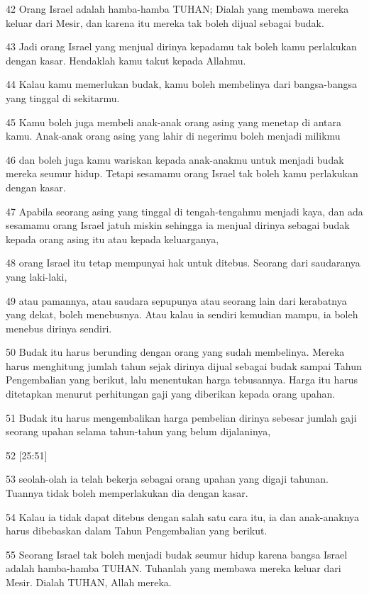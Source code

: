 \par 42 Orang Israel adalah hamba-hamba TUHAN; Dialah yang membawa mereka keluar dari Mesir, dan karena itu mereka tak boleh dijual sebagai budak.
\par 43 Jadi orang Israel yang menjual dirinya kepadamu tak boleh kamu perlakukan dengan kasar. Hendaklah kamu takut kepada Allahmu.
\par 44 Kalau kamu memerlukan budak, kamu boleh membelinya dari bangsa-bangsa yang tinggal di sekitarmu.
\par 45 Kamu boleh juga membeli anak-anak orang asing yang menetap di antara kamu. Anak-anak orang asing yang lahir di negerimu boleh menjadi milikmu
\par 46 dan boleh juga kamu wariskan kepada anak-anakmu untuk menjadi budak mereka seumur hidup. Tetapi sesamamu orang Israel tak boleh kamu perlakukan dengan kasar.
\par 47 Apabila seorang asing yang tinggal di tengah-tengahmu menjadi kaya, dan ada sesamamu orang Israel jatuh miskin sehingga ia menjual dirinya sebagai budak kepada orang asing itu atau kepada keluarganya,
\par 48 orang Israel itu tetap mempunyai hak untuk ditebus. Seorang dari saudaranya yang laki-laki,
\par 49 atau pamannya, atau saudara sepupunya atau seorang lain dari kerabatnya yang dekat, boleh menebusnya. Atau kalau ia sendiri kemudian mampu, ia boleh menebus dirinya sendiri.
\par 50 Budak itu harus berunding dengan orang yang sudah membelinya. Mereka harus menghitung jumlah tahun sejak dirinya dijual sebagai budak sampai Tahun Pengembalian yang berikut, lalu menentukan harga tebusannya. Harga itu harus ditetapkan menurut perhitungan gaji yang diberikan kepada orang upahan.
\par 51 Budak itu harus mengembalikan harga pembelian dirinya sebesar jumlah gaji seorang upahan selama tahun-tahun yang belum dijalaninya,
\par 52 [25:51]
\par 53 seolah-olah ia telah bekerja sebagai orang upahan yang digaji tahunan. Tuannya tidak boleh memperlakukan dia dengan kasar.
\par 54 Kalau ia tidak dapat ditebus dengan salah satu cara itu, ia dan anak-anaknya harus dibebaskan dalam Tahun Pengembalian yang berikut.
\par 55 Seorang Israel tak boleh menjadi budak seumur hidup karena bangsa Israel adalah hamba-hamba TUHAN. Tuhanlah yang membawa mereka keluar dari Mesir. Dialah TUHAN, Allah mereka.

